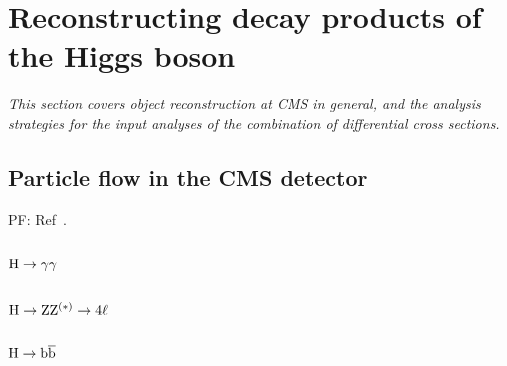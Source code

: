 \section{Reconstructing decay products of the Higgs boson}
\label{sec:inputs}

\emph{%
This section covers object reconstruction at CMS in general, and the analysis strategies for the input analyses of the combination of differential cross sections.
% 
}




\subsection{Particle flow in the CMS detector}

PF: Ref~\cite{Sirunyan:2017ulk}.


\subsection{\texorpdfstring{$\mathrm{H}\to\mathrm{\gamma}\mathrm{\gamma}$}{H to gamma gamma}}



\subsection{\texorpdfstring{$\mathrm{H}\to\mathrm{Z}\mathrm{Z}^{(\ast)}\to 4\ell$}{H to ZZ to four leptons}}


\subsection{\texorpdfstring{$\mathrm{H}\to\mathrm{b}\overline{\mathrm{b}}$}{H to bb}}

